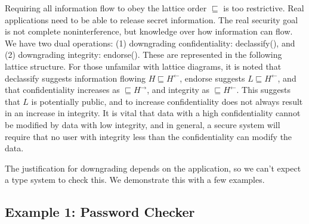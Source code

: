 \documentclass{article}
\begin{document}
Requiring all information flow to obey the lattice order $\sqsubseteq$ is too restrictive.  Real applications need to be able to release secret information. The real security goal is not complete noninterference, but knowledge over how information can flow. We have two dual operations: (1) downgrading confidentiality: declassify(), and (2) downgrading integrity: endorse(). These are represented in the following lattice structure. For those unfamilar with lattice diagrams, it is noted that declassify suggests information flowing $H \sqsubseteq{} H^{\leftarrow{}}$, endorse suggests $L \sqsubseteq{} H^{\leftarrow{}}$, and that confidentiality increases as $\sqsubseteq{} H^{\rightarrow{}}$, and integrity as $\sqsubseteq{} H^{\leftarrow{}}$. This suggests that $L$ is potentially public, and to increase confidentiality does not always result in an increase in integrity. It is vital that data with a high confidentiality cannot be modified by data with low integrity, and in general, a secure system will require that no user with integrity less than the confidentiality can modify the data. 
\newline
\newline
The justification for downgrading depends on the application, so we can't expect a type system to check this. We demonstrate this with a few examples. 

\subsection*{Example 1: Password Checker}
\end{document}
